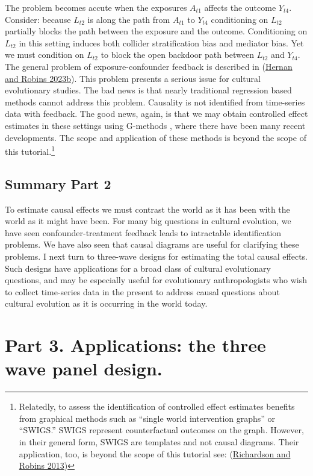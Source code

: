 \documentclass[
  singlecolumn]{report}
\begin{document}
The problem becomes accute when the exposures \(A_{t1}\) affects the
outcome \(Y_{t4}\). Consider: because \(L_{t2}\) is along the path from
\(A_{t1}\) to \(Y_{t4}\) conditioning on \(L_{t2}\) partially blocks the
path between the exposure and the outcome. Conditioning on \(L_{t2}\) in
this setting induces both collider stratification bias and mediator
bias. Yet we must condition on \(L_{t2}\) to block the open backdoor
path between \(L_{t2}\) and \(Y_{t4}\). The general problem of
exposure-confounder feedback is described in
(\protect\hyperlink{ref-hernan2023b}{Hernan and Robins 2023b}). This
problem presents a serious issue for cultural evolutionary studies. The
bad news is that nearly traditional regression based methods cannot
address this problem. Causality is not identified from time-series data
with feedback. The good news, again, is that we may obtain controlled
effect estimates in these settings using G-methods , where there have
been many recent developments. The scope and application of these
methods is beyond the scope of this tutorial.\footnote{Relatedly, to
  assess the identification of controlled effect estimates benefits from
  graphical methods such as ``single world intervention graphs'' or
  ``SWIGS.'' SWIGS represent counterfactual outcomes on the graph.
  However, in their general form, SWIGS are templates and not causal
  diagrams. Their application, too, is beyond the scope of this tutorial
  see: (\protect\hyperlink{ref-richardson2013}{Richardson and Robins
  2013})}

\hypertarget{summary-part-2}{%
\subsection{Summary Part 2}\label{summary-part-2}}

To estimate causal effects we must contrast the world as it has been
with the world as it might have been. For many big questions in cultural
evolution, we have seen confounder-treatment feedback leads to
intractable identification problems. We have also seen that causal
diagrams are useful for clarifying these problems. I next turn to
three-wave designs for estimating the total causal effects. Such designs
have applications for a broad class of cultural evolutionary questions,
and may be especially useful for evolutionary anthropologists who wish
to collect time-series data in the present to address causal questions
about cultural evolution as it is occurring in the world today.

\hypertarget{part-3.-applications-the-three-wave-panel-design.}{%
\section{Part 3. Applications: the three wave panel
design.}\label{part-3.-applications-the-three-wave-panel-design.}}
\end{document}
